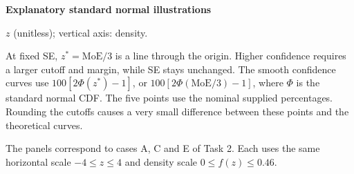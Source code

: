 \hfill\begin{minipage}[t]{.49\linewidth}\vspace{0pt}\centering
\textbf{Explanatory standard normal illustrations}\par
{}
{\small $z$ (unitless); vertical axis: density.\par}
\end{minipage}\par
At fixed SE, $z^*=\mathrm{MoE}/3$ is a line through the origin. Higher confidence requires a larger cutoff and margin, while SE stays unchanged.
The smooth confidence curves use $100[2\Phi(z^*)-1]$, or $100[2\Phi(\mathrm{MoE}/3)-1]$, where $\Phi$ is the standard normal CDF. The five points use the nominal supplied percentages. Rounding the cutoffs causes a very small difference between these points and the theoretical curves.

The panels correspond to cases A, C and E of Task 2. Each uses the same horizontal scale $-4\le z\le4$ and density scale $0\le f(z)\le0.46$.

